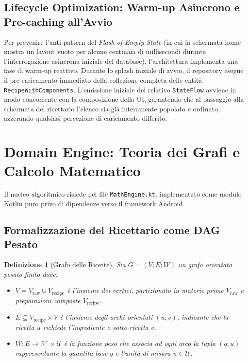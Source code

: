\documentclass[11pt,a4paper,titlepage]{article}
\newtheorem{definition}{Definizione}
\begin{document}
\subsection{Lifecycle Optimization: Warm-up Asincrono e Pre-caching all'Avvio}
Per prevenire l'anti-pattern del \textit{Flash of Empty State} (in cui la schermata home mostra un layout vuoto per alcune centinaia di millisecondi durante l'interrogazione asincrona iniziale del database), l'architettura implementa una fase di warm-up reattivo. 
Durante lo splash iniziale di avvio, il repository esegue il pre-caricamento immediato della collezione completa delle entit\`a \texttt{RecipeWithComponents}. L'emissione iniziale del relativo \texttt{StateFlow} avviene in modo concorrente con la composizione della UI, garantendo che al passaggio alla schermata del ricettario l'elenco sia gi\`a interamente popolato e ordinato, azzerando qualsiasi percezione di caricamento differito.

\newpage

\section{Domain Engine: Teoria dei Grafi e Calcolo Matematico}
Il nucleo algoritmico risiede nel file \texttt{MathEngine.kt}, implementato come modulo Kotlin puro privo di dipendenze verso il framework Android.

\subsection{Formalizzazione del Ricettario come DAG Pesato}
\begin{definition}[Grafo delle Ricette]
Sia $G = (V; E; W)$ un grafo orientato pesato finito dove:
\begin{itemize}
    \item $V = V_{\text{raw}} \cup V_{\text{recipe}}$ \`e l'insieme dei vertici, partizionato in materie prime $V_{\text{raw}}$ e preparazioni composte $V_{\text{recipe}}$.
    \item $E \subseteq V_{\text{recipe}} \times V$ \`e l'insieme degli archi orientati $(u; v)$, indicante che la ricetta $u$ richiede l'ingrediente o sotto-ricetta $v$.
    \item $W: E \to \mathbb{R}^+ \times \mathcal{U}$ \`e la funzione peso che associa ad ogni arco la tupla $(q; u)$ rappresentante la quantit\`a base $q$ e l'unit\`a di misura $u \in \mathcal{U}$.
\end{itemize}
\end{definition}
\end{document}
